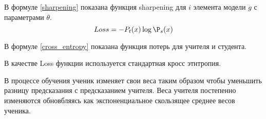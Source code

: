 \documentclass[../part_1.tex]{subfiles}
\begin{document}
    \par В формуле \ref{sharpening} показана функция sharpening для $i$ элемента модели $g$ с параметрами $\theta$. 
    \begin{equation}
        \label{cross_entropy}
        Loss = -P_t(x) \log \P_s(x)
    \end{equation}
    \par В формуле \ref{cross_entropy} показана функция потерь для учителя и студента.
    \par В качестве Loss функции используется стандартная кросс этнтропия.
    \par В процессе обучения ученик изменяет свои веса таким образом чтобы уменьшить разницу предсказания с предсказанием учителя. Веса учителя постепенно изменяются обновбляясь как экспоненциальное скользящее среднее весов ученика.
    
\end{document}
